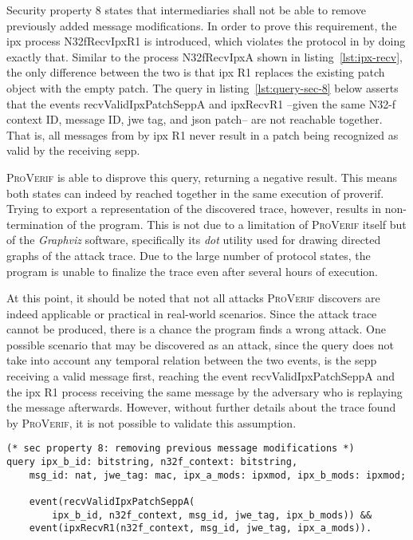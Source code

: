 Security property 8 states that intermediaries shall not be able to remove previously added message modifications.
In order to prove this requirement, the \gls{ipx} process {\sffamily N32fRecvIpxR1} is introduced, which violates the protocol in by doing exactly that.
Similar to the process {\sffamily N32fRecvIpxA} shown in listing~\ref{lst:ipx-recv}, the only difference between the two is that \gls{ipx} R1 replaces the existing patch object with the empty patch.
The query in listing~\ref{lst:query-sec-8} below asserts that the events {\sffamily recvValidIpxPatchSeppA} and {\sffamily ipxRecvR1} --given the same N32-f context ID, message ID, \gls{jwe} tag, and \gls{json} patch-- are not reachable together.
That is, all messages from by \gls{ipx} R1 never result in a patch being recognized as valid by the receiving \gls{sepp}.

\textsc{ProVerif} is able to disprove this query, returning a negative result.
This means both states can indeed by reached together in the same execution of proverif.
Trying to export a representation of the discovered trace, however, results in non-termination of the program.
This is not due to a limitation of \textsc{ProVerif} itself but of the \textit{Graphviz} software, specifically its \textit{dot} utility used for drawing directed graphs of the attack trace.
Due to the large number of protocol states, the program is unable to finalize the trace even after several hours of execution.

At this point, it should be noted that not all attacks \textsc{ProVerif} discovers are indeed applicable or practical in real-world scenarios.
Since the attack trace cannot be produced, there is a chance the program finds a wrong attack.
One possible scenario that may be discovered as an attack, since the query does not take into account any temporal relation between the two events, is the \gls{sepp} receiving a valid message first, reaching the event {\sffamily recvValidIpxPatchSeppA} and the \gls{ipx} R1 process receiving the same message by the adversary who is replaying the message afterwards.
However, without further details about the trace found by \textsc{ProVerif}, it is not possible to validate this assumption.

\begin{lstlisting}[caption={Query for security property 8},label={lst:query-sec-8},firstnumber=359]
(* sec property 8: removing previous message modifications *)
query ipx_b_id: bitstring, n32f_context: bitstring,
    msg_id: nat, jwe_tag: mac, ipx_a_mods: ipxmod, ipx_b_mods: ipxmod;

    event(recvValidIpxPatchSeppA(
        ipx_b_id, n32f_context, msg_id, jwe_tag, ipx_b_mods)) &&
    event(ipxRecvR1(n32f_context, msg_id, jwe_tag, ipx_a_mods)).
\end{lstlisting}

